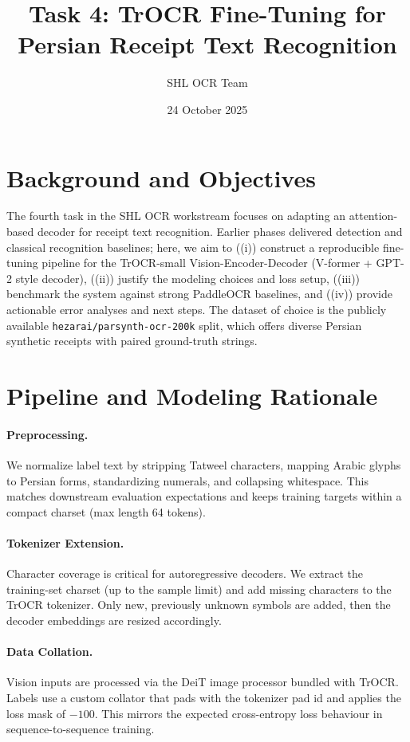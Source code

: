 \documentclass[11pt,a4paper]{article}
\title{Task 4: TrOCR Fine-Tuning for Persian Receipt Text Recognition}
\author{SHL OCR Team}
\date{24 October 2025}
\begin{document}
\maketitle

\section{Background and Objectives}
The fourth task in the SHL OCR workstream focuses on adapting an attention-based decoder for receipt text recognition. Earlier phases delivered detection and classical recognition baselines; here, we aim to ((i)) construct a reproducible fine-tuning pipeline for the TrOCR-small Vision-Encoder-Decoder (V-former + GPT-2 style decoder), ((ii)) justify the modeling choices and loss setup, ((iii)) benchmark the system against strong PaddleOCR baselines, and ((iv)) provide actionable error analyses and next steps. The dataset of choice is the publicly available \texttt{hezarai/parsynth-ocr-200k} split, which offers diverse Persian synthetic receipts with paired ground-truth strings.

\section{Pipeline and Modeling Rationale}
\paragraph{Preprocessing.} We normalize label text by stripping Tatweel characters, mapping Arabic glyphs to Persian forms, standardizing numerals, and collapsing whitespace. This matches downstream evaluation expectations and keeps training targets within a compact charset (max length 64 tokens).

\paragraph{Tokenizer Extension.} Character coverage is critical for autoregressive decoders. We extract the training-set charset (up to the sample limit) and add missing characters to the TrOCR tokenizer. Only new, previously unknown symbols are added, then the decoder embeddings are resized accordingly.

\paragraph{Data Collation.} Vision inputs are processed via the DeiT image processor bundled with TrOCR. Labels use a custom collator that pads with the tokenizer pad id and applies the loss mask of \(-100\). This mirrors the expected cross-entropy loss behaviour in sequence-to-sequence training.
\end{document}
